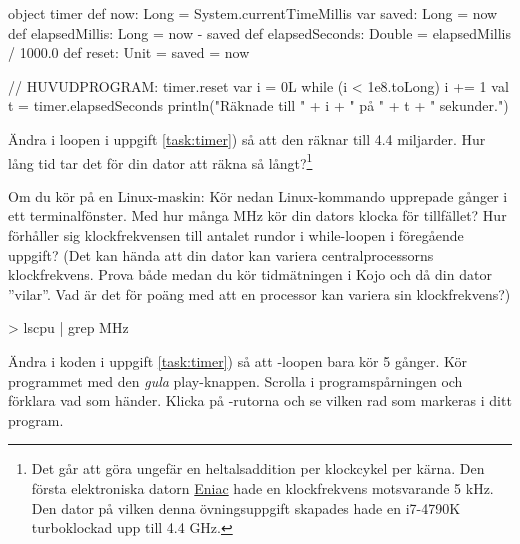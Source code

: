 \begin{Code}
object timer {
  def now: Long = System.currentTimeMillis
  var saved: Long = now
  def elapsedMillis: Long = now - saved
  def elapsedSeconds: Double = elapsedMillis / 1000.0
  def reset: Unit = { saved = now }
}

// HUVUDPROGRAM:
timer.reset
var i = 0L
while (i < 1e8.toLong) { i += 1 }
val t = timer.elapsedSeconds
println("Räknade till " + i + " på " + t + " sekunder.")
\end{Code}


\Subtask Ändra i loopen i uppgift \ref{task:timer}) så att den räknar till 4.4 miljarder. Hur lång tid tar det för din dator att räkna så långt?\footnote{Det går att göra ungefär en heltalsaddition per klockcykel per kärna. Den första elektroniska datorn \href{https://sv.wikipedia.org/wiki/ENIAC}{Eniac} hade en klockfrekvens motsvarande 5 kHz. Den dator på vilken denna övningsuppgift skapades hade en i7-4790K turboklockad upp till 4.4 GHz.
}

\Subtask  Om du kör på en Linux-maskin: Kör nedan Linux-kommando upprepade gånger i ett terminalfönster. Med hur många MHz kör din dators klocka för tillfället? Hur förhåller sig klockfrekvensen till antalet rundor i while-loopen i föregående uppgift? (Det kan hända att din dator kan variera centralprocessorns klockfrekvens. Prova både medan du kör tidmätningen i Kojo och då din dator ''vilar''. Vad är det för poäng med att en processor kan variera sin klockfrekvens?)
\begin{REPLnonum}
> lscpu | grep MHz
\end{REPLnonum}


\Subtask Ändra i koden i uppgift \ref{task:timer}) så att -loopen bara kör 5 gånger. Kör programmet med den \emph{gula} play-knappen. Scrolla i programspårningen och förklara vad som händer. Klicka på -rutorna och se vilken rad som markeras i ditt program.


